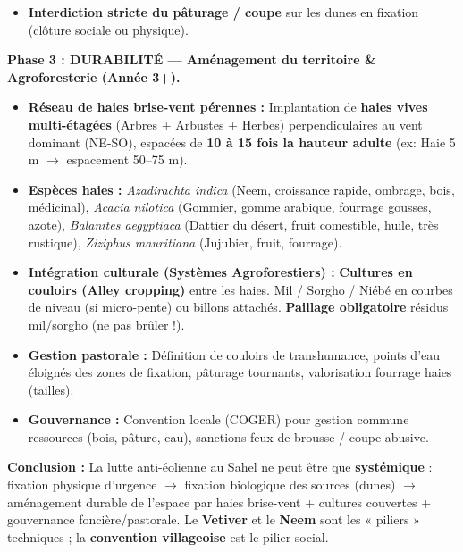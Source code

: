 \documentclass[11pt]{article}
\begin{document}
\begin{exoresolu}
\begin{itemize}
        \begin{itemize}
            \item \emph{Leptadenia pyrotechnica} (Nguiguiss) : Racines adventives sur tiges couchées, très résistant sécheresse/pâturage.
            \item \emph{Calotropis procera} (Pommier de Sodome) : Croissance rapide, graines anémochores, latex toxique (anti-pâturage).
            \item \emph{Euphorbia balsamifera} : Arbuste succulent, excellente fixation.
            \item \emph{Vetiveria zizanioides} (Vetiver) : En bas de pente des dunes / pieds de dune (racines profondes, touffe dense barrière physique).
        \end{itemize}
        \item \textbf{Interdiction stricte du pâturage / coupe} sur les dunes en fixation (clôture sociale ou physique).
    \end{itemize}
    \textbf{Phase 3 : DURABILITÉ — Aménagement du territoire \& Agroforesterie (Année 3+).}
    \begin{itemize}
        \item \textbf{Réseau de haies brise-vent pérennes :} Implantation de \textbf{haies vives multi-étagées} (Arbres + Arbustes + Herbes) perpendiculaires au vent dominant (NE-SO), espacées de \textbf{10 à 15 fois la hauteur adulte} (ex: Haie 5 m $\rightarrow$ espacement 50–75 m).
        \item \textbf{Espèces haies :} \emph{Azadirachta indica} (Neem, croissance rapide, ombrage, bois, médicinal), \emph{Acacia nilotica} (Gommier, gomme arabique, fourrage gousses, azote), \emph{Balanites aegyptiaca} (Dattier du désert, fruit comestible, huile, très rustique), \emph{Ziziphus mauritiana} (Jujubier, fruit, fourrage).
        \item \textbf{Intégration culturale (Systèmes Agroforestiers) :} \textbf{Cultures en couloirs (Alley cropping)} entre les haies. Mil / Sorgho / Niébé en courbes de niveau (si micro-pente) ou billons attachés. \textbf{Paillage obligatoire} résidus mil/sorgho (ne pas brûler !).
        \item \textbf{Gestion pastorale :} Définition de couloirs de transhumance, points d'eau éloignés des zones de fixation, pâturage tournants, valorisation fourrage haies (tailles).
        \item \textbf{Gouvernance :} Convention locale (COGER) pour gestion commune ressources (bois, pâture, eau), sanctions feux de brousse / coupe abusive.
    \end{itemize}
    \textbf{Conclusion :} La lutte anti-éolienne au Sahel ne peut être que \textbf{systémique} : fixation physique d'urgence $\rightarrow$ fixation biologique des sources (dunes) $\rightarrow$ aménagement durable de l'espace par haies brise-vent + cultures couvertes + gouvernance foncière/pastorale. Le \textbf{Vetiver} et le \textbf{Neem} sont les « piliers » techniques ; la \textbf{convention villageoise} est le pilier social.
\end{exoresolu}
\end{document}
